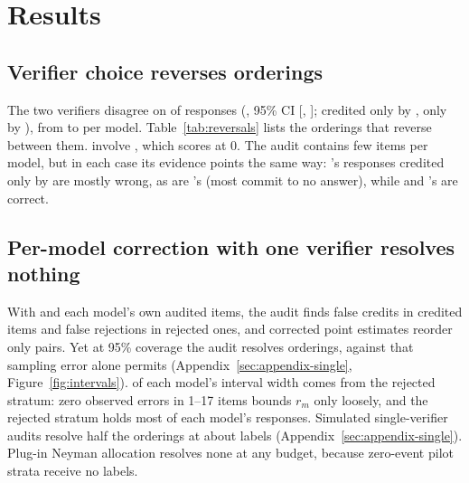 \section{Results}
\label{sec:results}

\subsection{Verifier choice reverses orderings}
\label{sec:results-census}

The two verifiers disagree on \nNDisagree{} of \nNRows{} responses
(\nDisRate{}, 95\% CI [\nDisLo, \nDisHi]; \nEmOnly{} credited only by
, \nSbOnly{} only by ), from \nDisMin{}
to \nDisMax{} per model. Table~\ref{tab:reversals} lists the \nScorerFlips{}
orderings that reverse between them. \nScorerFlipsCmdr{} involve
, which  scores at 0. The audit
contains few items per model, but in each case its evidence points the same
way: 's responses credited only by 
are mostly wrong, as are 's (most commit to no answer),
while  and 's are correct.

\begin{table}[t]
  \centering
  \caption{Orderings that reverse between the two verifiers. ``Sampling-clear'':
  the accuracy difference exceeds 1.96 standard errors under the named
  verifier(s). Last column: audited responses credited only by
   whose transcribed answer is correct, for each model.}
  \label{tab:reversals}
  \scriptsize
  \resizebox{\linewidth}{!}{}
\end{table}

\subsection{Per-model correction with one verifier resolves nothing}
\label{sec:results-single}

With  and each model's own audited items, the audit finds
\nFalseCredits{} false credits in \nNCredAud{} credited items and \nFalseMiss{}
false rejections in \nNWrongAud{} rejected ones, and corrected point
estimates reorder only \nPointFlips{} pairs. Yet at 95\% coverage the audit
resolves \nSingleComb{} orderings, against \nCeiling{} that sampling error
alone permits (Appendix~\ref{sec:appendix-single}, Figure~\ref{fig:intervals}).
\nRShare{} of each model's interval width comes from the rejected stratum:
zero observed errors in 1--17 items bounds $r_m$ only loosely, and the
rejected stratum holds most of each model's responses. Simulated
single-verifier audits resolve half the orderings at about \nLabelsEight{}
labels (Appendix~\ref{sec:appendix-single}). Plug-in Neyman allocation
resolves none at any budget, because zero-event pilot strata receive no
labels.

